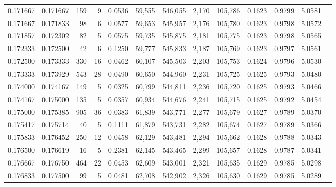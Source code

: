 \begin{tabular}{rrrrrrrrrrrrr}
0.171667 & 0.171667 &   159 &   9 &                                     0.0536 &  59,555 & 546,055 &   2,170 & 105,786 & 0.1623 & 0.9799 & 5.0581 \\
0.171667 & 0.171833 &    98 &   6 &                                     0.0577 &  59,653 & 545,957 &   2,176 & 105,780 & 0.1623 & 0.9798 & 5.0572 \\
0.171857 & 0.172302 &    82 &   5 &                                     0.0575 &  59,735 & 545,875 &   2,181 & 105,775 & 0.1623 & 0.9798 & 5.0565 \\
0.172333 & 0.172500 &    42 &   6 &                                     0.1250 &  59,777 & 545,833 &   2,187 & 105,769 & 0.1623 & 0.9797 & 5.0561 \\
0.172500 & 0.173333 &   330 &  16 &                                     0.0462 &  60,107 & 545,503 &   2,203 & 105,753 & 0.1624 & 0.9796 & 5.0530 \\
0.173333 & 0.173929 &   543 &  28 &                                     0.0490 &  60,650 & 544,960 &   2,231 & 105,725 & 0.1625 & 0.9793 & 5.0480 \\
0.174000 & 0.174167 &   149 &   5 &                                     0.0325 &  60,799 & 544,811 &   2,236 & 105,720 & 0.1625 & 0.9793 & 5.0466 \\
0.174167 & 0.175000 &   135 &   5 &                                     0.0357 &  60,934 & 544,676 &   2,241 & 105,715 & 0.1625 & 0.9792 & 5.0454 \\
0.175000 & 0.175385 &   905 &  36 &                                     0.0383 &  61,839 & 543,771 &   2,277 & 105,679 & 0.1627 & 0.9789 & 5.0370 \\
0.175417 & 0.175714 &    40 &   5 &                                     0.1111 &  61,879 & 543,731 &   2,282 & 105,674 & 0.1627 & 0.9789 & 5.0366 \\
0.175833 & 0.176452 &   250 &  12 &                                     0.0458 &  62,129 & 543,481 &   2,294 & 105,662 & 0.1628 & 0.9788 & 5.0343 \\
0.176500 & 0.176619 &    16 &   5 &                                     0.2381 &  62,145 & 543,465 &   2,299 & 105,657 & 0.1628 & 0.9787 & 5.0341 \\
0.176667 & 0.176750 &   464 &  22 &                                     0.0453 &  62,609 & 543,001 &   2,321 & 105,635 & 0.1629 & 0.9785 & 5.0298 \\
0.176833 & 0.177500 &    99 &   5 &                                     0.0481 &  62,708 & 542,902 &   2,326 & 105,630 & 0.1629 & 0.9785 & 5.0289 \\

\end{tabular}
